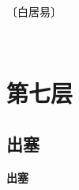 \documentclass[12pt,UTF-8,openany,fontset=none]{ctexbook}
\begin{document}
\begin{center}
    \vspace{10pt}
    
    \begin{large}
        
        〔白居易〕
        
    \end{large}
    
    \vspace{8pt}
    
    \begin{huge}
        
        \phantom{。}

        \phantom{。}
        
        \phantom{。}

        \phantom{。}

        \phantom{....}~~ \! {}
        
    \end{huge}
    
\end{center}

\vspace{8pt}
\clearpage

\chapter{第七层}
\clearpage

\section{出塞}



\begin{center}
    {\bfseries 出塞}
\end{center}
\end{document}
